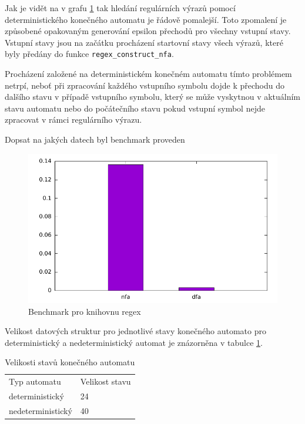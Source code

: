 Jak je vidět na v grafu \ref{fig:regex} tak hledání regulárních výrazů pomocí deterministického
konečného automatu je řádově pomalejší. Toto zpomalení je způsobené opakovaným generování
epsilon přechodů pro všechny vstupní stavy. Vstupní stavy jsou na začátku procházení
startovní stavy všech výrazů, které byly předány do funkce \texttt{regex\_construct\_nfa}.

Procházení založené na deterministickém konečném automatu tímto problémem netrpí,
neboť při zpracování každého vstupního symbolu dojde k přechodu do dalšího stavu v případě
vstupního symbolu, který se může vyskytnou v aktuálním stavu automatu nebo do počátečního stavu
pokud vstupní symbol nejde zpracovat v rámci regulárního výrazu.

Dopsat na jakých datech byl benchmark proveden

\begin{figure}[!htbp]
	\centering
	\includegraphics[scale=0.7]{fig/regex.pdf}
	\caption{Benchmark pro knihovnu regex}
    \label{fig:regex}
\end{figure}

Velikost datových struktur pro jednotlivé stavy konečného automato pro deterministický a nedeterministický
automat je znázorněna v tabulce \ref{tab:regex-size}.

\begin{table}[!htbp]
    \center
    \begin{tabular}{|l|l|}
    \hline
    Typ automatu & Velikost stavu\\ \hhline{|=|=|}
    deterministický  & 24\\ \hline
    nedeterministický & 40\\ \hline
    \end{tabular}
    \caption{Velikosti stavů konečného automatu}
    \label{tab:regex-size}
\end{table}

